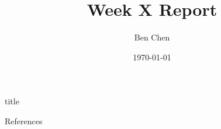 \documentclass{beamer}
\title{Week X Report}
\author{Ben Chen}
\institute{Dept of Computer Science and Engineering, SUSTech}
\date{\today}
\begin{document}
\frame{\titlepage}

\begin{frame}{title}

\end{frame}

\begin{frame}[allowframebreaks]{References}
\tiny
\printbibliography
\end{frame}
\end{document}
